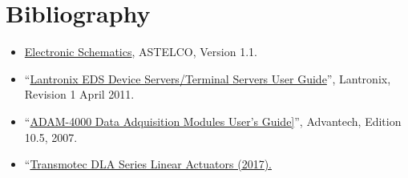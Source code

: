 \section{Bibliography}

\begin{flushleft}
\begin{itemize}
\item \href{bibliography/astelco-covers-electronics-schematic.pdf}{Electronic Schematics}, ASTELCO, Version 1.1.
\item “\href{bibliography/lantronix-eds-user-guide.pdf}{Lantronix EDS Device Servers/Terminal Servers User Guide}”, Lantronix, Revision 1 April 2011.
\item “\href{bibliography/advantech-adam-4000.pdf}{ADAM-4000 Data Adquisition Modules User's Guide]}”, Advantech, Edition 10.5, 2007.
\item “\href{bibliography/transmotec-dla.pdf}{Transmotec DLA Series Linear Actuators (2017).}
\end{itemize}
\end{flushleft}


